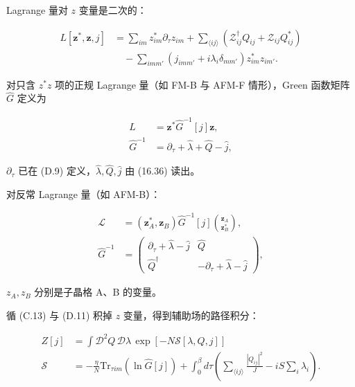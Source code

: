 Lagrange 量对 $z$ 变量是二次的：

\begin{align*}
L [ \mathbf {z} ^ {*}, \mathbf {z}, j ] & = \sum_ {im} z _ {im} ^ {*} \partial_ {\tau} z _ {im} + \sum_{\langle ij \rangle} \left( \mathcal {Z} _ {ij} ^ {\dagger} Q _ {ij} + \mathcal {Z} _ {ij} Q _ {ij} ^ {*} \right)\\
& \quad - \sum_ {imm '} \left( j _ {imm '} + i \lambda_ {i} \delta_{mm '} \right) z _ {im} ^ {*} z _ {im '} .
\tag{16.36}
\end{align*}

对只含 $z^{*}z$ 项的正规 Lagrange 量（如 FM-B 与 AFM-F 情形），Green 函数矩阵 $\hat{G}$ 定义为

\begin{align*}
L & = \mathbf {z} ^ {*} \hat {G} ^ {- 1} [ j ] \mathbf {z} ,\\
\hat {G} ^ {- 1} & = \partial_ {\tau} + \hat {\lambda} + \hat {Q} - \hat {j} ,
\tag{16.37}
\end{align*}

$\partial_{\tau}$ 已在 (D.9) 定义，$\hat{\lambda},\hat{Q},\hat{j}$ 由 (16.36) 读出。

对反常 Lagrange 量（如 AFM-B）：

\begin{align*}
\mathcal {L} & = \left( \mathbf {z} _ {A} ^ {*}, \mathbf {z} _ {B} \right) \hat {G} ^ {- 1} [ j ] \binom{\mathbf {z} _ {A}}{\mathbf {z} _ {B} ^ {*}} ,\\
\hat {G} ^ {- 1} & = \left( \begin{array}{cc} \partial_ {\tau} + \hat {\lambda} - \hat {j} & \hat {Q} \\ \hat {Q} ^ {\dagger} & - \partial_ {\tau} + \hat {\lambda} - \hat {j} \end{array} \right) ,
\tag{16.38}
\end{align*}

$z_{A}, z_{B}$ 分别是子晶格 A、B 的变量。

循 (C.13) 与 (D.11) 积掉 $z$ 变量，得到辅助场的路径积分：

\begin{align*}
Z [ j ] & = \int \mathcal {D} ^ {2} Q \, \mathcal {D} \lambda \, \exp \left[ - N \mathcal {S} [ \lambda, Q, j ] \right]\\
\mathcal {S} & = - \frac {\eta}{N} \mathrm{Tr}_{\tau im} \left( \ln \hat {G} [ j ] \right) + \int_ {0} ^ {\beta} d \tau \left( \sum_{\langle ij \rangle} \frac {| Q _ {ij} | ^ {2}}{J} - iS \sum_ {i} \lambda_ {i} \right) .
\tag{16.39}
\end{align*}


